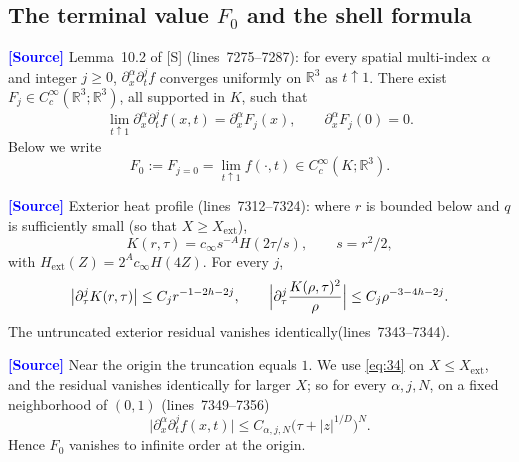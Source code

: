\documentclass[11pt,a4paper]{article}
\theoremstyle{definition}
\theoremstyle{remark}
\newcommand{\R}{\mathbb{R}}
\newcommand{\lnos}[1]{(lines~#1)}
\newcommand{\ORIG}{\textcolor{blue}{\textbf{[Source]}}}
\begin{document}
\subsection{The terminal value \texorpdfstring{$F_0$}{F\_0} and the shell formula}
\label{sec:note2-formula}

\ORIG
Lemma~10.2 of [S] \lnos{7275--7287}: for every spatial multi-index $\alpha$ and integer $j\ge 0$,
$\partial_x^\alpha\partial_t^j f$ converges uniformly on $\R^3$ as $t\uparrow 1$.
There exist $F_j\in C^\infty_c(\R^3;\R^3)$, all supported in $K$, such that
\begin{equation}
\label{eq:106}
\lim_{t\uparrow 1}\partial_x^\alpha\partial_t^j f(x,t)
=\partial_x^\alpha F_j(x),\qquad
\partial_x^\alpha F_j(0)=0.
\end{equation}
Below we write
\begin{equation}
\label{eq:F0}
F_0:=F_{j=0}=\lim_{t\uparrow 1}f(\cdot,t)\in C^\infty_c(K;\R^3).
\end{equation}

\ORIG
Exterior heat profile \lnos{7312--7324}: where $r$ is bounded below and $q$ is sufficiently small
(so that $X\ge X_{\mathrm{ext}}$),
\begin{equation}
\label{eq:107}
K(r,\tau)=c_\infty s^{-A}H(2\tau/s),\qquad s=r^2/2,
\end{equation}
with $H_{\mathrm{ext}}(Z)=2^A c_\infty H(4Z)$. For every $j$,
\begin{equation}
\label{eq:108}
\bigl|\partial_\tau^j K(r,\tau)\bigr|\le C_j r^{-1-2h-2j},\qquad
\Bigl|\partial_\tau^j\frac{K(\rho,\tau)^2}{\rho}\Bigr|\le C_j\rho^{-3-4h-2j}.
\end{equation}
The untruncated exterior residual vanishes identically\lnos{7343--7344}.

\ORIG
Near the origin the truncation equals $1$. We use \eqref{eq:34} on $X\le X_{\mathrm{ext}}$,
and the residual vanishes identically for larger $X$; so for every $\alpha,j,N$, on a fixed
neighborhood of $(0,1)$ \lnos{7349--7356}
\begin{equation}
\label{eq:109}
\bigl|\partial_x^\alpha\partial_t^j f(x,t)\bigr|
\le C_{\alpha,j,N}\bigl(\tau+|z|^{1/D}\bigr)^N.
\end{equation}
Hence $F_0$ vanishes to infinite order at the origin.
\end{document}
